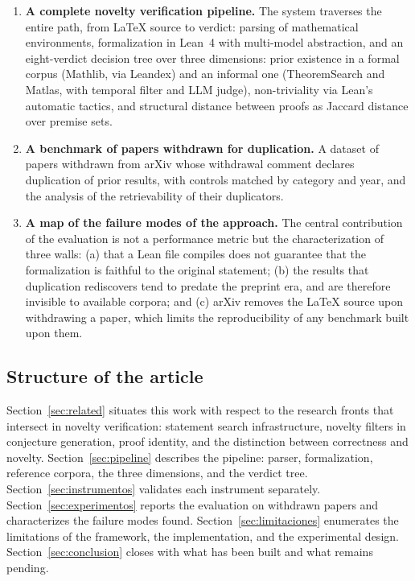 \begin{enumerate}
\item \textbf{A complete novelty verification pipeline.} The system traverses the entire path, from LaTeX source to verdict: parsing of mathematical environments, formalization in Lean~4 with multi-model abstraction, and an eight-verdict decision tree over three dimensions: prior existence in a formal corpus (Mathlib, via Leandex) and an informal one (TheoremSearch and Matlas, with temporal filter and LLM judge), non-triviality via Lean's automatic tactics, and structural distance between proofs as Jaccard distance over premise sets.

\item \textbf{A benchmark of papers withdrawn for duplication.} A dataset of papers withdrawn from arXiv whose withdrawal comment declares duplication of prior results, with controls matched by category and year, and the analysis of the retrievability of their duplicators.

\item \textbf{A map of the failure modes of the approach.} The central contribution of the evaluation is not a performance metric but the characterization of three walls: (a) that a Lean file compiles does not guarantee that the formalization is faithful to the original statement; (b) the results that duplication rediscovers tend to predate the preprint era, and are therefore invisible to available corpora; and (c) arXiv removes the LaTeX source upon withdrawing a paper, which limits the reproducibility of any benchmark built upon them.
\end{enumerate}

\subsection{Structure of the article}

Section~\ref{sec:related} situates this work with respect to the research fronts that intersect in novelty verification: statement search infrastructure, novelty filters in conjecture generation, proof identity, and the distinction between correctness and novelty. Section~\ref{sec:pipeline} describes the pipeline: parser, formalization, reference corpora, the three dimensions, and the verdict tree. Section~\ref{sec:instrumentos} validates each instrument separately. Section~\ref{sec:experimentos} reports the evaluation on withdrawn papers and characterizes the failure modes found. Section~\ref{sec:limitaciones} enumerates the limitations of the framework, the implementation, and the experimental design. Section~\ref{sec:conclusion} closes with what has been built and what remains pending.